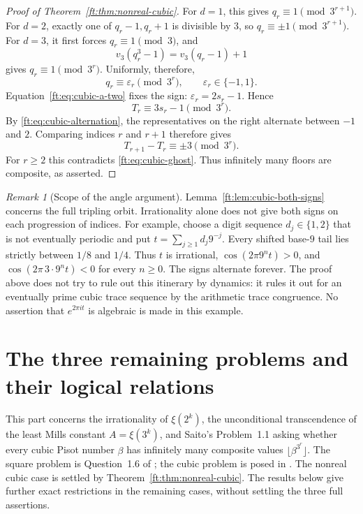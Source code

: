 \documentclass[11pt,a4paper]{article}
\theoremstyle{definition}
\theoremstyle{remark}
\newtheorem{remark}[theorem]{Remark}
\numberwithin{equation}{section}
\begin{document}
\begin{proof}[Proof of Theorem~\ref{ft:thm:nonreal-cubic}]
For $d=1$, this gives $q_r\equiv1\pmod{3^{r+1}}$. For $d=2$,
exactly one of $q_r-1,q_r+1$ is divisible by $3$, so
$q_r\equiv\pm1\pmod{3^{r+1}}$. For $d=3$, it first forces
$q_r\equiv1\pmod3$, and
\[
 v_3(q_r^3-1)=v_3(q_r-1)+1
\]
gives $q_r\equiv1\pmod{3^r}$. Uniformly, therefore,
\[
 q_r\equiv\varepsilon_r\pmod{3^r},\qquad
 \varepsilon_r\in\{-1,1\}.
\]
Equation~\eqref{ft:eq:cubic-a-two} fixes the sign:
$\varepsilon_r=2s_r-1$. Hence
\[
 T_r\equiv3s_r-1\pmod{3^r}.
\]
By \eqref{ft:eq:cubic-alternation}, the representatives on the right
alternate between $-1$ and $2$. Comparing indices $r$ and $r+1$
therefore gives
\[
 T_{r+1}-T_r\equiv\pm3\pmod{3^r}.
\]
For $r\geq2$ this contradicts \eqref{ft:eq:cubic-ghost}. Thus
infinitely many floors are composite, as asserted.
\end{proof}

\begin{remark}[Scope of the angle argument]
\label{ft:rem:cubic-sign-scope}
Lemma~\ref{ft:lem:cubic-both-signs} concerns the full tripling orbit.
Irrationality alone does not give both signs on each progression of
indices. For example, choose a digit sequence $d_j\in\{1,2\}$ that
is not eventually periodic and put $t=\sum_{j\geq1}d_j9^{-j}$.
Every shifted base-$9$ tail lies strictly between $1/8$ and $1/4$.
Thus $t$ is irrational,
$\cos(2\pi9^nt)>0$, and $\cos(2\pi\,3\cdot9^nt)<0$ for every
$n\geq0$. The signs alternate forever. The proof above does not
try to rule out this itinerary by dynamics: it rules it out for an
eventually prime cubic trace sequence by the arithmetic trace congruence.
No assertion that $e^{2\pi it}$ is algebraic is made in this example.
\end{remark}

\section{The three remaining problems and their logical relations}
\label{ft:sec:bridge}

This part concerns the irrationality of $\xi(2^k)$, the unconditional
transcendence of the least Mills constant $A=\xi(3^k)$, and Saito's
Problem~1.1 asking whether every cubic Pisot number $\beta$ has infinitely
many composite values $\lfloor\beta^{3^r}\rfloor$.
The square problem is Question~1.6 of \cite{SaitoMills}; the cubic
problem is posed in \cite{SaitoIntervals}. The nonreal cubic case is
settled by Theorem~\ref{ft:thm:nonreal-cubic}. The results below give
further exact restrictions in the remaining cases, without settling
the three full assertions.
\end{document}
